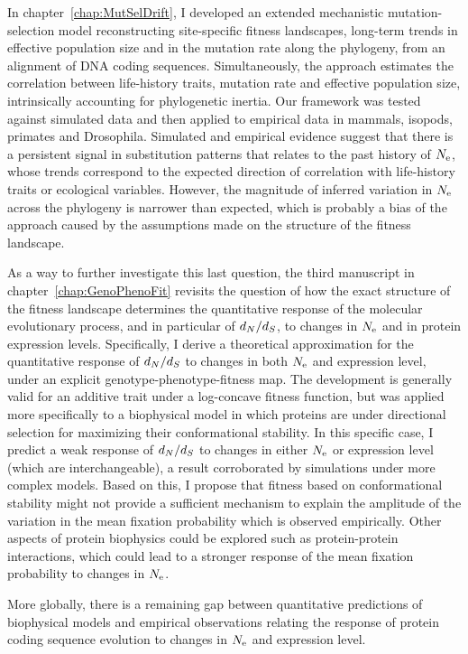 In chapter~\ref{chap:MutSelDrift}, I developed an extended mechanistic mutation-selection model reconstructing site-specific fitness landscapes, long-term trends in \gls{effective population size} and in the mutation rate along the phylogeny, from an alignment of \acrshort{DNA} coding sequences.
Simultaneously, the approach estimates the correlation between life-history traits, mutation rate and \gls{effective population size}, intrinsically accounting for phylogenetic inertia.
Our framework was tested against simulated data and then applied to empirical data in mammals, isopods, primates and Drosophila.
Simulated and empirical evidence suggest that there is a persistent signal in \gls{substitution} patterns that relates to the past history of $N_{\text{e}}$, whose trends correspond to the expected direction of correlation with life-history traits or ecological variables.
However, the magnitude of inferred variation in $N_{\text{e}}$ across the phylogeny is narrower than expected, which is probably a bias of the approach caused by the assumptions made on the structure of the fitness landscape.

As a way to further investigate this last question, the third manuscript in chapter~\ref{chap:GenoPhenoFit} revisits the question of how the exact structure of the fitness landscape determines the quantitative response of the molecular evolutionary process, and in particular of $d_N / d_S$, to changes in $N_{\text{e}}$ and in protein expression levels.
Specifically, I derive a theoretical approximation for the quantitative response of $d_N / d_S$ to changes in both $N_{\text{e}}$ and expression level, under an explicit genotype-phenotype-fitness map.
The development is generally valid for an additive trait under a log-concave fitness function, but was applied more specifically to a biophysical model in which proteins are under directional selection for maximizing their conformational stability.
In this specific case, I predict a weak response of $d_N / d_S$ to changes in either $N_{\text{e}}$ or expression level (which are interchangeable), a result corroborated by simulations under more complex models.
Based on this, I propose that fitness based on conformational stability might not provide a sufficient mechanism to explain the amplitude of the variation in the mean fixation probability which is observed empirically.
Other aspects of protein biophysics could be explored such as protein-protein interactions, which could lead to a stronger response of the mean fixation probability to changes in $N_{\text{e}}$.

More globally, there is a remaining gap between quantitative predictions of biophysical models and empirical observations relating the response of protein coding sequence evolution to changes in $N_{\text{e}}$ and expression level.


